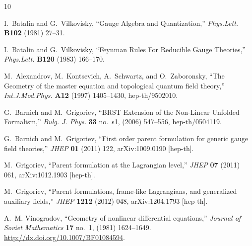\documentclass[a4paper,12pt]{article}
\numberwithin{equation}{section} %
\numberwithin{equation}{section}
\begin{document}
\providecommand{\href}[2]{#2}\begingroup\raggedright\begin{thebibliography}{10}

I.~Batalin and G.~Vilkovisky, ``{G}auge {A}lgebra and {Q}uantization,''
\href{http://dx.doi.org/10.1016/0370-2693(81)90205-7}{{\em Phys.Lett.} {\bfseries B102} (1981) 27--31}.

I.~Batalin and G.~Vilkovisky, ``{F}eynman {R}ules {F}or {R}educible {G}auge {T}heories,''
\href{http://dx.doi.org/10.1016/0370-2693(83)90645-7}{{\em Phys.Lett.} {\bfseries B120} (1983) 166--170}.

M.~Alexandrov, M.~Kontsevich, A.~Schwartz, and O.~Zaboronsky, ``{T}he {G}eometry of the master equation and topological quantum field theory,'' \href{http://dx.doi.org/10.1142/S0217751X97001031}{{\em Int.J.Mod.Phys.} {\bfseries A12} (1997) 1405--1430},
\href{http://arxiv.org/abs/hep-th/9502010}{{\ttfamily hep-th/9502010}}.

G.~Barnich and M.~Grigoriev, ``{BRST Extension of the Non-Linear Unfolded Formalism},'' {\em Bulg. J. Phys.} {\bfseries 33} no.~s1, (2006) 547--556, \href{http://arxiv.org/abs/hep-th/0504119}{{\ttfamily hep-th/0504119}}.

G.~Barnich and M.~Grigoriev, ``{F}irst order parent formulation for generic gauge field theories,'' \href{http://dx.doi.org/10.1007/JHEP01(2011)122}{{\em JHEP} {\bfseries 01} (2011) 122},
\href{http://arxiv.org/abs/1009.0190}{{\ttfamily arXiv:1009.0190 [hep-th]}}.

M.~Grigoriev, ``{P}arent formulation at the {L}agrangian level,'' \href{http://dx.doi.org/10.1007/JHEP07(2011)061}{{\em JHEP} {\bfseries 07} (2011) 061},
\href{http://arxiv.org/abs/1012.1903}{{\ttfamily arXiv:1012.1903 [hep-th]}}.

M.~Grigoriev, ``{P}arent formulations, frame-like {L}agrangians, and generalized auxiliary fields,'' \href{http://dx.doi.org/10.1007/JHEP12(2012)048}{{\em JHEP} {\bfseries 1212} (2012) 048},
\href{http://arxiv.org/abs/1204.1793}{{\ttfamily arXiv:1204.1793 [hep-th]}}.

A.~M. Vinogradov, ``{G}eometry of nonlinear differential equations,'' \href{http://dx.doi.org/10.1007/BF01084594}{{\em Journal of Soviet Mathematics} {\bfseries 17} no.~1, (1981) 1624--1649}. \url{http://dx.doi.org/10.1007/BF01084594}.


\end{thebibliography}
\end{document}
